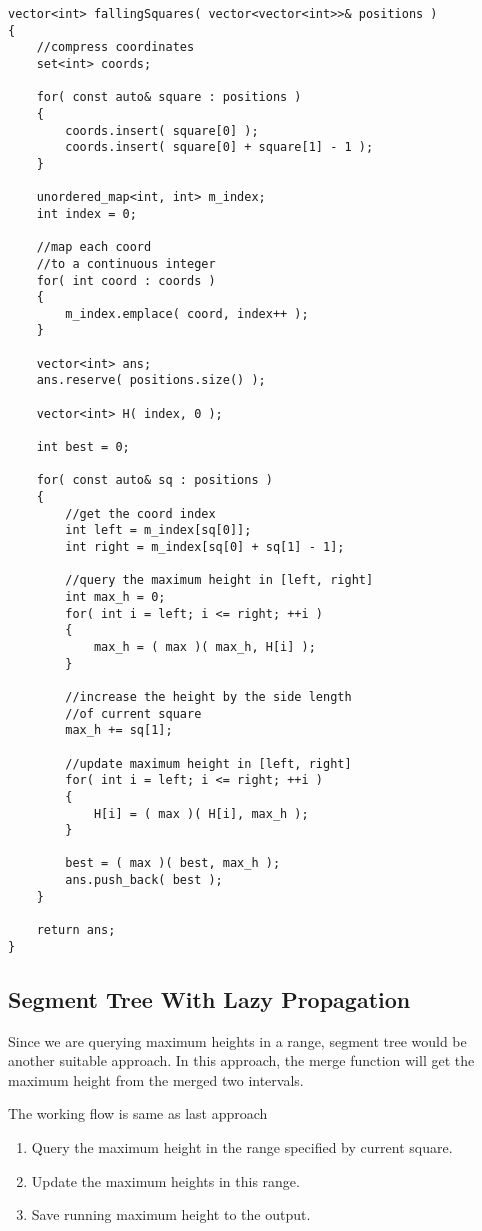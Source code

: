 \begin{lstlisting}[style=customc, caption={Coordinate Compression}]
vector<int> fallingSquares( vector<vector<int>>& positions )
{
    //compress coordinates
    set<int> coords;

    for( const auto& square : positions )
    {
        coords.insert( square[0] );
        coords.insert( square[0] + square[1] - 1 );
    }

    unordered_map<int, int> m_index;
    int index = 0;

    //map each coord
    //to a continuous integer
    for( int coord : coords )
    {
        m_index.emplace( coord, index++ );
    }

    vector<int> ans;
    ans.reserve( positions.size() );

    vector<int> H( index, 0 );

    int best = 0;

    for( const auto& sq : positions )
    {
        //get the coord index
        int left = m_index[sq[0]];
        int right = m_index[sq[0] + sq[1] - 1];

        //query the maximum height in [left, right]
        int max_h = 0;
        for( int i = left; i <= right; ++i )
        {
            max_h = ( max )( max_h, H[i] );
        }

        //increase the height by the side length
        //of current square
        max_h += sq[1];

        //update maximum height in [left, right]
        for( int i = left; i <= right; ++i )
        {
            H[i] = ( max )( H[i], max_h );
        }

        best = ( max )( best, max_h );
        ans.push_back( best );
    }

    return ans;
}
\end{lstlisting}

\subsection{Segment Tree With Lazy Propagation}
Since we are querying maximum heights in a range, segment tree would be another suitable approach. In this approach, the merge function will get the maximum height from the merged two intervals.

The working flow is same as last approach
\begin{enumerate}
\item Query the maximum height in the range specified by current square.
\item Update the maximum heights in this range.
\item Save running maximum height to the output.
\end{enumerate}

